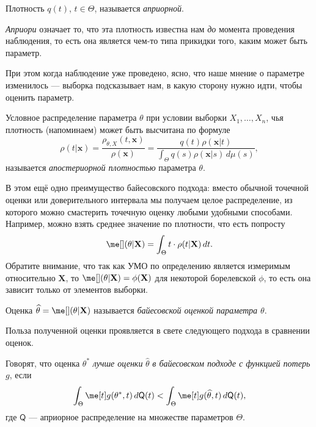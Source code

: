 \begin{definition}
    Плотность $q(t)$, $t \in \Theta$, называется \textit{априорной}.
\end{definition}

\textit{Априори} означает то, что эта плотность известна нам \textit{до} момента проведения наблюдения, то есть она является чем-то типа прикидки того, каким может быть параметр.

При этом когда наблюдение уже проведено, ясно, что наше мнение о параметре изменилось --- выборка подсказывает нам, в какую сторону нужно идти, чтобы оценить параметр. 

\begin{definition}
    Условное распределение параметра $\theta$ при условии выборки $X_1, \ldots, X_n$, чья плотность (напоминаем) может быть высчитана по формуле
    \[
    \rho(t | \mathbf{x}) = \frac{\rho_{\theta, X}(t, \mathbf{x})}{\rho(\mathbf{x})} = \frac{q(t) \rho(\mathbf{x} | t)}{\int_{\Theta} q(s) \rho(\mathbf{x}|s) \,d\mu(s)},
    \]
    называется \textit{апостериорной плотностью} параметра $\theta$.
\end{definition}

В этом ещё одно преимущество байесовского подхода: вместо обычной точечной оценки или доверительного интервала мы получаем целое распределение, из которого можно смастерить точечную оценку любыми удобными способами. Например, можно взять среднее значение по плотности, что есть попросту
$$\me[](\theta | \mathbf X) = \int_{\Theta} t\cdot \rho(t|\mathbf X)\,dt.$$
Обратите внимание, что так как УМО по определению является измеримым относительно $\mathbf X$, то $\me[](\theta | \mathbf X) = \phi(\mathbf X)$ для некоторой борелевской $\phi$, то есть она зависит только от элементов выборки.

\begin{definition}
    Оценка $\widehat{\theta} = \me[](\theta | \mathbf X)$ называется \textit{байесовской оценкой параметра $\theta$}.
\end{definition}

Польза полученной оценки проявляется в свете следующего подхода в сравнении оценок.

\begin{definition}
    Говорят, что оценка $\theta^*$ \textit{лучше оценки} $\widehat{\theta}$ \textit{в байесовском подходе с функцией потерь $g$}, если
    \[
    \int_{\Theta} \me[t] g(\theta^*, t) \,d\mathsf{Q}(t) < \int_{\Theta} \me[t] g(\widehat \theta, t)\, d\mathsf{Q}(t),
    \]
    где $\mathsf{Q}$ --- априорное распределение на множестве параметров $\Theta$.
\end{definition}

